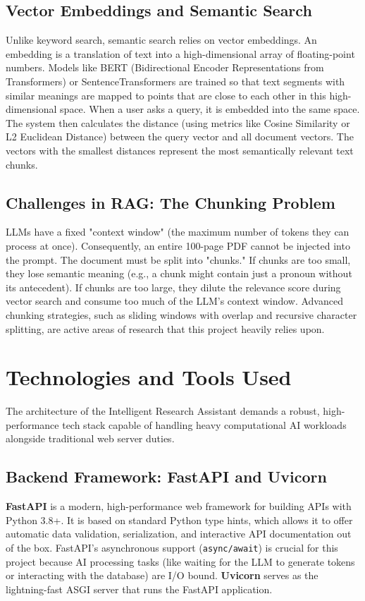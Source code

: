 \documentclass[12pt, a4paper]{report}
\begin{document}
\section{Vector Embeddings and Semantic Search}
Unlike keyword search, semantic search relies on vector embeddings. An embedding is a translation of text into a high-dimensional array of floating-point numbers. Models like BERT (Bidirectional Encoder Representations from Transformers) or SentenceTransformers are trained so that text segments with similar meanings are mapped to points that are close to each other in this high-dimensional space. 
When a user asks a query, it is embedded into the same space. The system then calculates the distance (using metrics like Cosine Similarity or L2 Euclidean Distance) between the query vector and all document vectors. The vectors with the smallest distances represent the most semantically relevant text chunks.

\section{Challenges in RAG: The Chunking Problem}
LLMs have a fixed "context window" (the maximum number of tokens they can process at once). Consequently, an entire 100-page PDF cannot be injected into the prompt. The document must be split into "chunks." If chunks are too small, they lose semantic meaning (e.g., a chunk might contain just a pronoun without its antecedent). If chunks are too large, they dilute the relevance score during vector search and consume too much of the LLM's context window. Advanced chunking strategies, such as sliding windows with overlap and recursive character splitting, are active areas of research that this project heavily relies upon.

\chapter{Technologies and Tools Used}

The architecture of the Intelligent Research Assistant demands a robust, high-performance tech stack capable of handling heavy computational AI workloads alongside traditional web server duties.

\section{Backend Framework: FastAPI and Uvicorn}
\textbf{FastAPI} is a modern, high-performance web framework for building APIs with Python 3.8+. It is based on standard Python type hints, which allows it to offer automatic data validation, serialization, and interactive API documentation out of the box. FastAPI's asynchronous support (\texttt{async/await}) is crucial for this project because AI processing tasks (like waiting for the LLM to generate tokens or interacting with the database) are I/O bound.
\textbf{Uvicorn} serves as the lightning-fast ASGI server that runs the FastAPI application.
\end{document}
